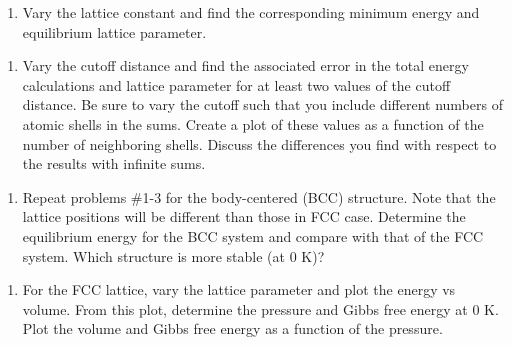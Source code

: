 \documentclass[11pt]{article}
\providecommand{\tightlist}{%
      \setlength{\itemsep}{0pt}\setlength{\parskip}{0pt}}
\begin{document}
    \begin{enumerate}
\def\labelenumi{\arabic{enumi}.}
\setcounter{enumi}{1}
\tightlist
\item
  Vary the lattice constant and find the corresponding minimum energy
  and equilibrium lattice parameter.
\end{enumerate}

    \begin{enumerate}
\def\labelenumi{\arabic{enumi}.}
\setcounter{enumi}{2}
\tightlist
\item
  Vary the cutoff distance and find the associated error in the total
  energy calculations and lattice parameter for at least two values of
  the cutoff distance. Be sure to vary the cutoff such that you include
  different numbers of atomic shells in the sums. Create a plot of these
  values as a function of the number of neighboring shells. Discuss the
  differences you find with respect to the results with infinite sums.
\end{enumerate}

    \begin{enumerate}
\def\labelenumi{\arabic{enumi}.}
\setcounter{enumi}{3}
\tightlist
\item
  Repeat problems \#1-3 for the body-centered (BCC) structure. Note that
  the lattice positions will be different than those in FCC case.
  Determine the equilibrium energy for the BCC system and compare with
  that of the FCC system. Which structure is more stable (at 0 K)?
\end{enumerate}

    \begin{enumerate}
\def\labelenumi{\arabic{enumi}.}
\setcounter{enumi}{4}
\tightlist
\item
  For the FCC lattice, vary the lattice parameter and plot the energy vs
  volume. From this plot, determine the pressure and Gibbs free energy
  at 0 K. Plot the volume and Gibbs free energy as a function of the
  pressure.
\end{enumerate}


    
    
    
\end{document}
